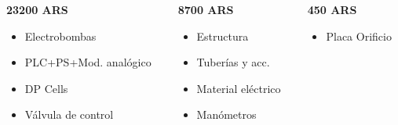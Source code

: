 {\begin{columns}[T]
	 \begin{column}{0.3\textwidth}
	    \begin{techintblock}
		\centering
		\textbf{23200 ARS}
	    \end{techintblock}
	    \footnotesize
	    \begin{itemize}
	     \item Electrobombas
	     \item PLC+PS+Mod. analógico
	     \item DP Cells
	     \item Válvula de control
	    \end{itemize}
	 \end{column}
	 
	 \begin{column}{0.3\textwidth}
	    \begin{fingblock}
		\centering
		\textbf{8700 ARS}
	    \end{fingblock}
	    \footnotesize
	     \begin{itemize}
	      \item Estructura
	      \item Tuberías y acc.
	      \item Material eléctrico
	      \item Manómetros
	     \end{itemize}
	 \end{column}

	 \begin{column}{0.3\textwidth}
	    \begin{puglesiblock}
		\centering
		\textbf{450 ARS}
	    \end{puglesiblock}
	    \footnotesize
	    \begin{itemize}
	     \item Placa Orificio
	    \end{itemize}

	 \end{column}
	\end{columns}
}

